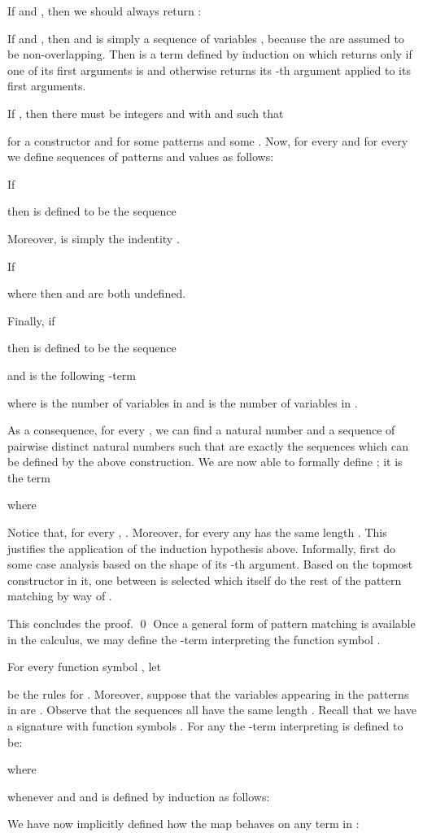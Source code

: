 \documentclass{LMCS}
\newenvironment{varitemize}
{
\begin{list}{\labelitemi}
{\setlength{\itemsep}{0.0mm}
 \setlength{\topsep}{0.0mm}
 \setlength{\parindent}{0.0mm}
 \setlength{\parskip}{0.0mm}
 \setlength{\parsep}{0.0mm}
 \setlength{\partopsep}{0.0mm}
 \setlength{\leftmargin}{15pt}
 \setlength{\labelsep}{5pt}
 \setlength{\labelwidth}{10pt}}}
{
 \end{list} 
}
\newenvironment{varitemizeii}
{
\begin{list}{\labelitemiv}
{\setlength{\itemsep}{0.0mm}
 \setlength{\topsep}{0.0mm}
 \setlength{\parindent}{0.0mm}
 \setlength{\parskip}{0.0mm}
 \setlength{\parsep}{0.0mm}
 \setlength{\partopsep}{0.0mm}
 \setlength{\leftmargin}{15pt}
 \setlength{\labelsep}{5pt}
 \setlength{\labelwidth}{10pt}}}
{
 \end{list} 
}
\newcounter{number}
\begin{document}
\begin{varitemize}
\item
  If  and , then we should always return : 
  
\item
  If  and , then  and  is simply a sequence of variables 
  , because the  are assumed to be non-overlapping.
  Then  is a term defined by induction on 
  which returns  only if one of its first  arguments is  and otherwise
  returns its -th argument applied to its first  arguments.
\item
  If , then there must be integers  and  with 
   and  such that
  
  for a constructor  and for some patterns  and some .
  Now, for every  
  and for every  
  we define sequences of patterns  and values  as follows:
  \begin{varitemizeii}
  \item
    If 
    
    then  is defined to be the sequence
    
    Moreover,  is simply the indentity .
  \item
    If 
    
    where  then  and  are both undefined.
  \item
    Finally, if
    
    then  is defined to be the sequence
    
    and  is the following -term
    
    where  is the number of variables in  and  is the
    number of variables in .
  \end{varitemizeii}
  As a consequence, for every , we can find a natural number  and 
  a sequence of pairwise distinct natural numbers  such that 
   are exactly the sequences which can
  be defined by the above construction. We are now able to formally define
  ; it is the term
  
  where
  
  Notice that, for every ,
  . Moreover, for every  any
   has the same length .
  This justifies the application of the
  induction hypothesis above. Informally,  first do some case
  analysis based on the shape of its -th argument. Based on the topmost constructor in it,
  one between  is selected which itself
  do the rest of the pattern matching by way of .
\end{varitemize}
This concludes the proof.
\qed
Once a general form of pattern matching is available in the  calculus, we may define
the -term  interpreting the function symbol .
\begin{defi}\label{Def-TRSonetolambdaII-fun}
For every function symbol , let

be the rules for . Moreover, suppose that
the variables appearing in the patterns in  are
. Observe that the
sequences  all have
the same length . Recall that we have a signature with function symbols . For any  
the -term 
interpreting  is defined to be:

where

whenever  and  and
 is defined by induction as follows:

\end{defi}
We have now implicitly defined how the map  behaves on
any term in :
\end{document}
